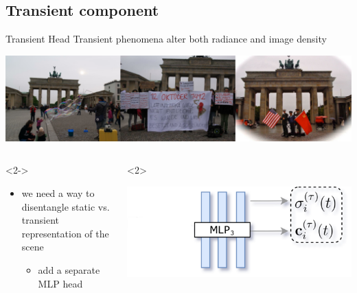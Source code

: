 \documentclass[aspectratio=1610]{beamer}
\begin{document}
\subsection{Transient component}
\begin{frame}{Transient Head}
    Transient phenomena alter both radiance and image density
    \bigskip
    \begin{center}
        \includegraphics[width=.5\textwidth]{issues-transient.png}
    \end{center}
    \bigskip
    \pause
    \begin{columns}
        \begin{column}{.5\textwidth}
            \begin{onlyenv}<2->
                \begin{itemize}
                    \item we need a way to disentangle static vs. transient representation of the scene
                    \begin{itemize}
                        \item add a separate MLP head
                    \end{itemize}
                \end{itemize}
            \end{onlyenv}
        \end{column}
        \begin{column}{.5\textwidth}
            \begin{onlyenv}<2>
                \begin{center}
                    \includegraphics[width=.9\textwidth]{nerfu-no-t.png}

\end{center}
\end{onlyenv}
\end{column}
\end{columns}
\end{frame}
\end{document}

